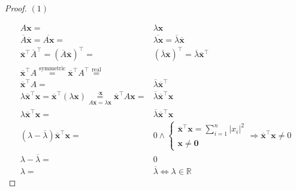 \documentclass[
]{book}
\theoremstyle{definition}
\theoremstyle{definition}
\theoremstyle{definition}
\theoremstyle{definition}
\theoremstyle{remark}
\begin{document}
\begin{proof}
\(\left(1\right)\)

\[
\begin{aligned}
A\boldsymbol{x}= & \lambda\boldsymbol{x}\\
\overline{A}\overline{\boldsymbol{x}}=\overline{A\boldsymbol{x}}= & \overline{\lambda\boldsymbol{x}}=\overline{\lambda}\overline{\boldsymbol{x}}\\
\overline{\boldsymbol{x}}^{\intercal}\overline{A}^{\intercal}=\left(\overline{A}\overline{\boldsymbol{x}}\right)^{\intercal}= & \left(\overline{\lambda}\overline{\boldsymbol{x}}\right)^{\intercal}=\overline{\lambda}\overline{\boldsymbol{x}}^{\intercal}\\
\overline{\boldsymbol{x}}^{\intercal}A\overset{\text{symmetric}}{=}\overline{\boldsymbol{x}}^{\intercal}A^{\intercal}\overset{\text{real}}{=}\\
\overline{\boldsymbol{x}}^{\intercal}A= & \overline{\lambda}\overline{\boldsymbol{x}}^{\intercal}\\
\lambda\overline{\boldsymbol{x}}^{\intercal}\boldsymbol{x}=\overline{\boldsymbol{x}}^{\intercal}\left(\lambda\boldsymbol{x}\right)\underset{A\boldsymbol{x}=\lambda\boldsymbol{x}}{\overset{\cdot\boldsymbol{x}}{=}}\overline{\boldsymbol{x}}^{\intercal}A\boldsymbol{x}= & \overline{\lambda}\overline{\boldsymbol{x}}^{\intercal}\boldsymbol{x}\\
\lambda\overline{\boldsymbol{x}}^{\intercal}\boldsymbol{x}= & \overline{\lambda}\overline{\boldsymbol{x}}^{\intercal}\boldsymbol{x}\\
\left(\lambda-\overline{\lambda}\right)\overline{\boldsymbol{x}}^{\intercal}\boldsymbol{x}= & 0\wedge\begin{cases}
\overline{\boldsymbol{x}}^{\intercal}\boldsymbol{x}=\sum\limits _{i=1}^{n}\left|x_{i}\right|^{2}\\
\boldsymbol{x}\ne\boldsymbol{0}
\end{cases}\Rightarrow\overline{\boldsymbol{x}}^{\intercal}\boldsymbol{x}\ne0\\
\lambda-\overline{\lambda}= & 0\\
\lambda= & \overline{\lambda}\Leftrightarrow\lambda\in\mathbb{R}
\end{aligned}
\]
\end{proof}
\end{document}
